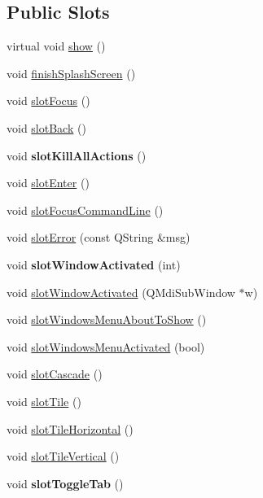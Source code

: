 \subsection*{Public Slots}
\begin{DoxyCompactItemize}
\item 
virtual void \hyperlink{classQC__ApplicationWindow_a72f318a8fbf1eafc3c96fb1f94f1b3c0}{show} ()
\item 
void \hyperlink{classQC__ApplicationWindow_afa20cdd79b7141a6f421bc8ebddb5f75}{finish\-Splash\-Screen} ()
\item 
void \hyperlink{classQC__ApplicationWindow_a37941e6f27c718509f1f0de0ce68a29c}{slot\-Focus} ()
\item 
void \hyperlink{classQC__ApplicationWindow_aba3999d223b2a32d0917358470d91ec3}{slot\-Back} ()
\item 
\hypertarget{classQC__ApplicationWindow_afc2a42a8a40b6c0fa2002e6b32acb4c7}{void {\bfseries slot\-Kill\-All\-Actions} ()}\label{classQC__ApplicationWindow_afc2a42a8a40b6c0fa2002e6b32acb4c7}

\item 
void \hyperlink{classQC__ApplicationWindow_a5d84d7c84cbb8ae03927fba1beb69bdb}{slot\-Enter} ()
\item 
void \hyperlink{classQC__ApplicationWindow_a1e8e570be4223b257f140390cf503a05}{slot\-Focus\-Command\-Line} ()
\item 
void \hyperlink{classQC__ApplicationWindow_afe691ae2a962021a064a47777076f3f5}{slot\-Error} (const Q\-String \&msg)
\item 
\hypertarget{classQC__ApplicationWindow_ad4ed272d574edb05271f945102026df8}{void {\bfseries slot\-Window\-Activated} (int)}\label{classQC__ApplicationWindow_ad4ed272d574edb05271f945102026df8}

\item 
void \hyperlink{classQC__ApplicationWindow_a22ea58095b0a4c06e67f88d23f48e438}{slot\-Window\-Activated} (Q\-Mdi\-Sub\-Window $\ast$w)
\item 
void \hyperlink{classQC__ApplicationWindow_a74918d1038db416cdb891b94f2e833bb}{slot\-Windows\-Menu\-About\-To\-Show} ()
\item 
void \hyperlink{classQC__ApplicationWindow_a3d717bc20ddccdfe6eeb2b170ee806d4}{slot\-Windows\-Menu\-Activated} (bool)
\item 
void \hyperlink{classQC__ApplicationWindow_a3b8e64f10c7d000e0bcd898b94a76f00}{slot\-Cascade} ()
\item 
void \hyperlink{classQC__ApplicationWindow_a7e1b36c7547ae210a868c9e3de85215f}{slot\-Tile} ()
\item 
void \hyperlink{classQC__ApplicationWindow_a62c8cd9eaf82f0dc4c1aba5ce6422207}{slot\-Tile\-Horizontal} ()
\item 
void \hyperlink{classQC__ApplicationWindow_ac5d7a38890c8145878ee3724c91f4e66}{slot\-Tile\-Vertical} ()
\item 
\hypertarget{classQC__ApplicationWindow_a393d24e1111458ad4fb9204dbcfe6f24}{void {\bfseries slot\-Toggle\-Tab} ()}\label{classQC__ApplicationWindow_a393d24e1111458ad4fb9204dbcfe6f24}


\end{DoxyCompactItemize}
